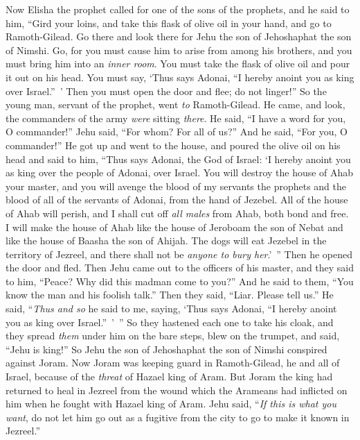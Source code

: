 \begin{biblechapter} %
 Now Elisha the prophet called for one of the sons of the prophets, and he said to him, “Gird your loins, and take this flask of olive oil in your hand, and go to Ramoth-Gilead.
\verse Go there and look there for Jehu the son of Jehoshaphat the son of Nimshi. Go, for you must cause him to arise from among his brothers, and you must bring him into an \textit{inner room}.
\verse You must take the flask of olive oil and pour it out on his head. You must say, ‘Thus says Adonai, “I hereby anoint you as king over Israel.” ’ Then you must open the door and flee; do not linger!”
\verse So the young man, servant of the prophet, went \textit{to} Ramoth-Gilead.
\verse He came, and look, the commanders of the army \textit{were} sitting \textit{there}. He said, “I have a word for you, O commander!” Jehu said, “For whom? For all of us?” And he said, “For you, O commander!”
\verse He got up and went to the house, and poured the olive oil on his head and said to him, “Thus says Adonai, the God of Israel: ‘I hereby anoint you as king over the people of Adonai, over Israel.
\verse You will destroy the house of Ahab your master, and you will avenge the blood of my servants the prophets and the blood of all of the servants of Adonai, from the hand of Jezebel.
\verse All of the house of Ahab will perish, and I shall cut off \textit{all males} from Ahab, both bond and free.
\verse I will make the house of Ahab like the house of Jeroboam the son of Nebat and like the house of Baasha the son of Ahijah.
\verse The dogs will eat Jezebel in the territory of Jezreel, and there shall not be \textit{anyone to bury her}.’ ” Then he opened the door and fled.
 Then Jehu came out to the officers of his master, and they said to him, “Peace? Why did this madman come to you?” And he said to them, “You know the man and his foolish talk.”
\verse Then they said, “Liar. Please tell us.” He said, “\textit{Thus and so} he said to me, saying, ‘Thus says Adonai, “I hereby anoint you as king over Israel.” ’ ”
\verse So they hastened each one to take his cloak, and they spread \textit{them} under him on the bare steps, blew on the trumpet, and said, “Jehu is king!”
\verse So Jehu the son of Jehoshaphat the son of Nimshi conspired against Joram. Now Joram was keeping guard in Ramoth-Gilead, he and all of Israel, because of the \textit{threat} of Hazael king of Aram.
\verse But Joram the king had returned to heal in Jezreel from the wound which the Arameans had inflicted on him when he fought with Hazael king of Aram. Jehu said, “\textit{If this is what you want}, do not let him go out as a fugitive from the city to go to make it known in Jezreel.”

\end{biblechapter}
